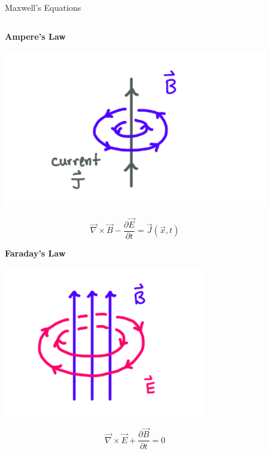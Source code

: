 \documentclass[UKenglish]{beamer}
\begin{document}
\begin{frame}{Maxwell's Equations}
\begin{columns}[c]
    
    \begin{center}
    
    \textbf{Ampere's Law}
    
    \includegraphics[scale=.4]{figures/ampere.png}
    
    \vspace{-10mm}
    
    \small
    $$ \vec{\nabla} \times \vec{B} - \frac{\partial \vec{E}}{\partial t} = \vec{J}(\vec{x},t) $$
    
    \normalsize
    
    \textbf{Faraday's Law}
    
    \includegraphics[scale=.4]{figures/faraday.png}
    
    \vspace{-10mm}
    
    \small
    $$ \vec{\nabla} \times \vec{E} + \frac{\partial \vec{B}}{\partial t} = 0 $$ 
    \normalsize
    
    \end{center}
   
    
    \end{columns}
    
    
\end{frame}
\end{document}
